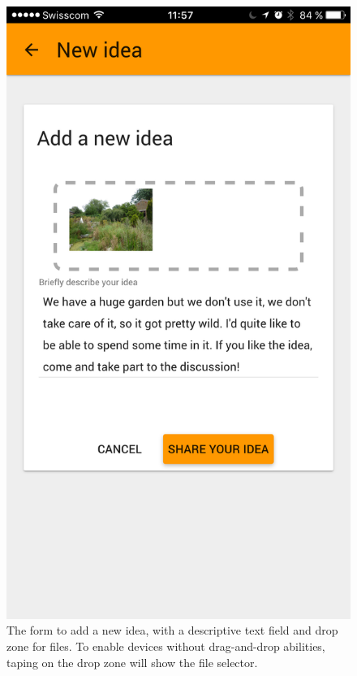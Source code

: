 \documentclass[a4paper,12pt,twoside]{article}
\begin{document}
\begin{figure}[!htb]
\begin{minipage}[t]{.32\textwidth}
    \end{minipage}
    \hfill
    \begin{minipage}[t]{.32\textwidth}
        \centering
        \includegraphics[width=\textwidth]{images/flow_addIdea_2.png}
        \caption{The form to add a new idea, with a descriptive text field and drop zone for files. To enable devices without drag-and-drop abilities, taping on the drop zone will show the file selector.}
    \end{minipage}

\end{figure}
\end{document}
